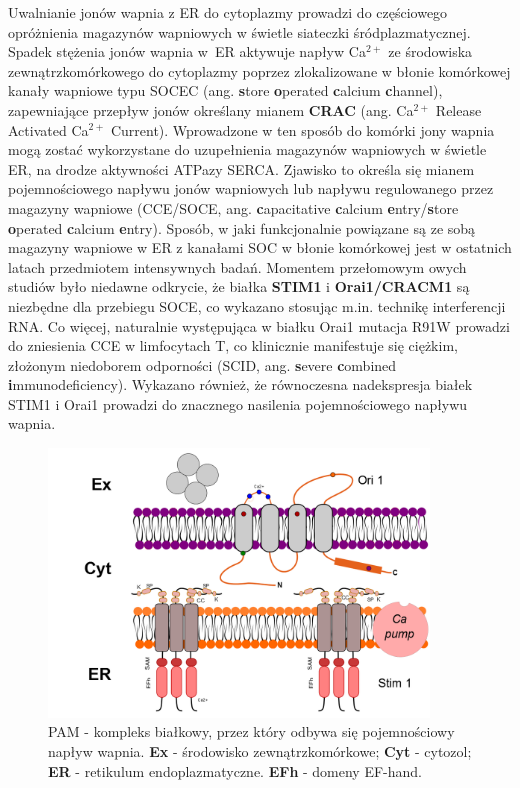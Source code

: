 Uwalnianie jonów wapnia z ER do cytoplazmy prowadzi do częściowego opróżnienia magazynów wapniowych w świetle siateczki śródplazmatycznej. Spadek stężenia jonów wapnia w~ER aktywuje napływ Ca$^{2+}$ ze środowiska zewnątrzkomórkowego do cytoplazmy poprzez zlokalizowane w błonie komórkowej kanały wapniowe typu \mbox{SOCEC} (ang. \textbf{s}tore \textbf{o}perated \textbf{c}alcium \textbf{c}hannel), zapewniające przepływ jonów określany mianem \textbf{CRAC} (ang. Ca$^{2+}$ Release Activated Ca$^{2+}$ Current). Wprowadzone w ten sposób do komórki jony wapnia mogą zostać wykorzystane do uzupełnienia magazynów wapniowych w świetle ER, na drodze aktywności ATPazy SERCA. Zjawisko to określa się mianem pojemnościowego napływu jonów wapniowych lub napływu regulowanego przez magazyny wapniowe (CCE/SOCE, ang. \textbf{c}apacitative \textbf{c}alcium \textbf{e}ntry/\textbf{s}tore \textbf{o}perated \textbf{c}alcium \textbf{e}ntry). Sposób, w jaki funkcjonalnie powiązane są ze sobą magazyny wapniowe w ER z kanałami SOC w błonie komórkowej jest w ostatnich latach przedmiotem intensywnych badań. Momentem przełomowym owych studiów było niedawne odkrycie, że białka \textbf{STIM1} i \textbf{Orai1/CRACM1} są niezbędne dla przebiegu SOCE, co wykazano stosując m.in. technikę interferencji RNA. Co więcej, naturalnie występująca w białku Orai1 mutacja R91W prowadzi do zniesienia CCE w limfocytach T, co klinicznie manifestuje się ciężkim, złożonym niedoborem odporności (SCID, ang. \textbf{s}evere \textbf{c}ombined \textbf{i}mmunodeficiency). Wykazano również, że równoczesna nadekspresja białek STIM1 i Orai1 prowadzi do znacznego nasilenia pojemnościowego napływu wapnia.

\begin{figure}[tb]
	\centering
	\includegraphics[width=0.9\textwidth]{rysunki/rozdzial_1/PAM.png}
	\caption [PAM - kompleks białkowy]{PAM - kompleks białkowy, przez który odbywa się pojemnościowy napływ wapnia. \textbf{Ex} - środowisko zewnątrzkomórkowe; \textbf{Cyt} - cytozol; \textbf{ER} - retikulum endoplazmatyczne. \textbf{EFh} - domeny EF-hand.}
	\label{fig:PAM}
\end{figure}

